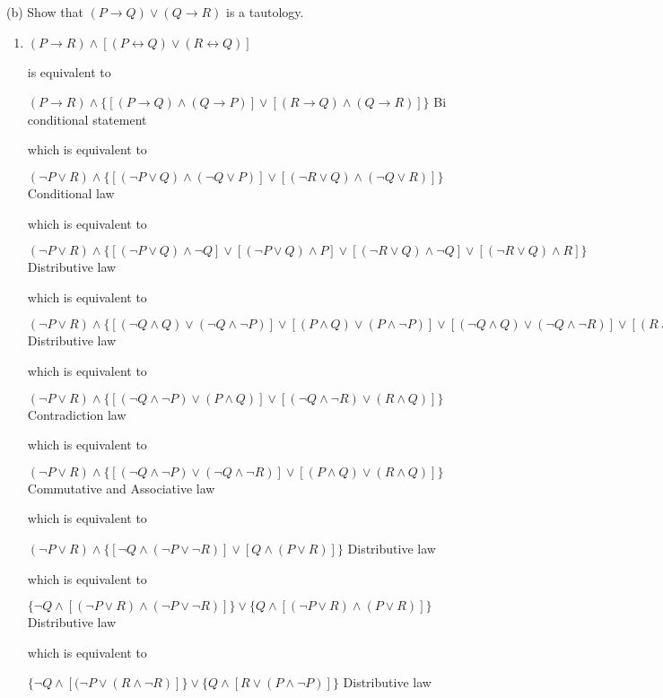 \documentclass{article}
\begin{document}
(b) Show that $(P \rightarrow Q) \lor (Q \rightarrow R)$ is a tautology.
\begin{enumerate} [label=(\alph*)]
    \item 
    $(P \rightarrow R) \land [(P \leftrightarrow Q)\lor (R \leftrightarrow Q)]$
    
    is equivalent to
    
    $(P \rightarrow R) \land \{[(P \rightarrow Q) \land (Q \rightarrow P)]\lor [(R \rightarrow Q) \land (Q \rightarrow R)]\}$ Bi conditional statement
    
    which is equivalent to
    
    
    $(\neg P \lor R) \land \{[(\neg P \lor Q) \land (\neg Q \lor P)]\lor [(\neg R \lor Q) \land (\neg Q \lor R)]\}$ Conditional law
    
    which is equivalent to 
    
    $(\neg P \lor R)\land \{[(\neg P \lor  Q ) \land  \neg Q]\lor [(\neg P \lor Q )\land P] \lor [(\neg R \lor  Q ) \land  \neg Q]\lor [(\neg R \lor Q )\land R]\}$ Distributive law
    
    which is equivalent to 
    
    $(\neg P \lor R)\land \{[(\neg Q \land Q)\lor (\neg Q \land \neg P)]\lor[(P \land Q)\lor(P \land \neg P)] \lor [(\neg Q \land Q)\lor (\neg Q \land \neg R)]\lor[(R \land Q)\lor(R \land \neg R)]\}$ Distributive law
    
    which is equivalent to 
    
    $(\neg P \lor R)\land \{[(\neg Q \land \neg P)\lor(P \land Q)]\lor[(\neg Q  \land \neg R)\lor(R \land Q)] \}$ Contradiction law
    
    which is equivalent to 
    
    $(\neg P \lor R)\land \{[(\neg Q \land \neg P)\lor(\neg Q \land \neg R)]\lor[(P  \land Q)\lor(R \land Q)] \}$  Commutative and Associative law
    
    which is equivalent to
    
    $(\neg P \lor R)\land \{[\neg Q \land (\neg P \lor \neg R)]\lor[Q \land (P \lor R)] \}$ Distributive law
    
    which is equivalent to
    
    $\{\neg Q \land [(\neg P \lor R) \land (\neg P \lor \neg R)] \} \lor\{Q \land [(\neg P \lor R) \land (P \lor R)] \}$ Distributive law
    
    which is equivalent to
    
    $\{\neg Q \land [(\neg P  \lor (R\land \neg R)] \} \lor\{Q \land [ R \lor (P \land \neg P)] \}$ Distributive law
    

\end{enumerate}
\end{document}
